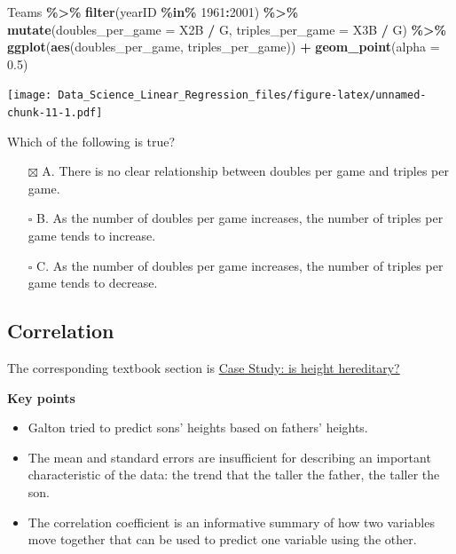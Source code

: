 \documentclass[
]{article}
\newenvironment{Shaded}{\begin{snugshade}}{\end{snugshade}}
\newcommand{\DataTypeTok}[1]{\textcolor[rgb]{0.13,0.29,0.53}{#1}}
\newcommand{\DecValTok}[1]{\textcolor[rgb]{0.00,0.00,0.81}{#1}}
\newcommand{\FloatTok}[1]{\textcolor[rgb]{0.00,0.00,0.81}{#1}}
\newcommand{\KeywordTok}[1]{\textcolor[rgb]{0.13,0.29,0.53}{\textbf{#1}}}
\newcommand{\NormalTok}[1]{#1}
\newcommand{\OperatorTok}[1]{\textcolor[rgb]{0.81,0.36,0.00}{\textbf{#1}}}
\newcommand{\StringTok}[1]{\textcolor[rgb]{0.31,0.60,0.02}{#1}}
\providecommand{\tightlist}{%
  \setlength{\itemsep}{0pt}\setlength{\parskip}{0pt}}
\begin{document}
\begin{Shaded}
\begin{Highlighting}[]
\NormalTok{Teams }\OperatorTok{\%\textgreater{}\%}\StringTok{ }\KeywordTok{filter}\NormalTok{(yearID }\OperatorTok{\%in\%}\StringTok{ }\DecValTok{1961}\OperatorTok{:}\DecValTok{2001}\NormalTok{) }\OperatorTok{\%\textgreater{}\%}
\StringTok{  }\KeywordTok{mutate}\NormalTok{(}\DataTypeTok{doubles\_per\_game =}\NormalTok{ X2B }\OperatorTok{/}\StringTok{ }\NormalTok{G, }\DataTypeTok{triples\_per\_game =}\NormalTok{ X3B }\OperatorTok{/}\StringTok{ }\NormalTok{G) }\OperatorTok{\%\textgreater{}\%}
\StringTok{  }\KeywordTok{ggplot}\NormalTok{(}\KeywordTok{aes}\NormalTok{(doubles\_per\_game, triples\_per\_game)) }\OperatorTok{+}\StringTok{ }
\StringTok{  }\KeywordTok{geom\_point}\NormalTok{(}\DataTypeTok{alpha =} \FloatTok{0.5}\NormalTok{)}
\end{Highlighting}
\end{Shaded}

\texttt{[image: Data\_Science\_Linear\_Regression\_files/figure-latex/unnamed-chunk-11-1.pdf]}

Which of the following is true?

\begin{itemize}
\tightlist
\item[$\boxtimes$]
  A. There is no clear relationship between doubles per game and triples
  per game.
\item[$\square$]
  B. As the number of doubles per game increases, the number of triples
  per game tends to increase.
\item[$\square$]
  C. As the number of doubles per game increases, the number of triples
  per game tends to decrease.
\end{itemize}

\hypertarget{correlation}{%
\subsection{Correlation}\label{correlation}}

The corresponding textbook section is
\href{https://rafalab.github.io/dsbook/regression.html\#case-study-is-height-hereditary}{Case
Study: is height hereditary?}

\textbf{Key points}

\begin{itemize}
\tightlist
\item
  Galton tried to predict sons' heights based on fathers' heights.
\item
  The mean and standard errors are insufficient for describing an
  important characteristic of the data: the trend that the taller the
  father, the taller the son.
\item
  The correlation coefficient is an informative summary of how two
  variables move together that can be used to predict one variable using
  the other.
\end{itemize}
\end{document}
